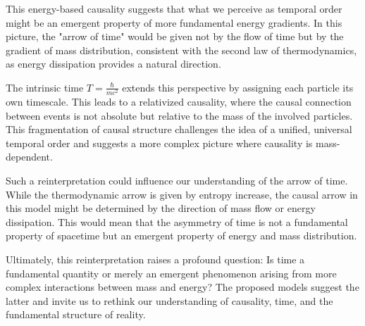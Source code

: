 \documentclass[a4paper,12pt]{article}
\begin{document}
	This energy-based causality suggests that what we perceive as temporal order might be an emergent property of more fundamental energy gradients. In this picture, the "arrow of time" would be given not by the flow of time but by the gradient of mass distribution, consistent with the second law of thermodynamics, as energy dissipation provides a natural direction.
	
	The intrinsic time \( T = \frac{\hbar}{m c^2} \) extends this perspective by assigning each particle its own timescale. This leads to a relativized causality, where the causal connection between events is not absolute but relative to the mass of the involved particles. This fragmentation of causal structure challenges the idea of a unified, universal temporal order and suggests a more complex picture where causality is mass-dependent.
	
	Such a reinterpretation could influence our understanding of the arrow of time. While the thermodynamic arrow is given by entropy increase, the causal arrow in this model might be determined by the direction of mass flow or energy dissipation. This would mean that the asymmetry of time is not a fundamental property of spacetime but an emergent property of energy and mass distribution.
	
	Ultimately, this reinterpretation raises a profound question: Is time a fundamental quantity or merely an emergent phenomenon arising from more complex interactions between mass and energy? The proposed models suggest the latter and invite us to rethink our understanding of causality, time, and the fundamental structure of reality.
	
\end{document}
